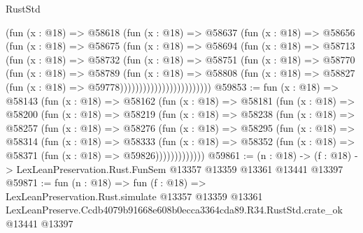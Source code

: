 \begin{lexlean}{RustStd}
\begin{coremodule}
                          (fun (x : @18) =>
                          @58618
                            (fun (x : @18) =>
                            @58637
                              (fun (x : @18) =>
                              @58656
                                (fun (x : @18) =>
                                @58675
                                  (fun (x : @18) =>
                                  @58694
                                    (fun (x : @18) =>
                                    @58713
                                      (fun (x : @18) =>
                                      @58732
                                        (fun (x : @18) =>
                                        @58751
                                          (fun (x : @18) =>
                                          @58770
                                            (fun (x : @18) =>
                                            @58789
                                              (fun (x : @18) =>
                                              @58808
                                                (fun (x : @18) =>
                                                @58827
                                                  (fun (x : @18) => @59778))))))))))))))))))))))))
@59853 := fun (x : @18) =>
  @58143
    (fun (x : @18) =>
    @58162
      (fun (x : @18) =>
      @58181
        (fun (x : @18) =>
        @58200
          (fun (x : @18) =>
          @58219
            (fun (x : @18) =>
            @58238
              (fun (x : @18) =>
              @58257
                (fun (x : @18) =>
                @58276
                  (fun (x : @18) =>
                  @58295
                    (fun (x : @18) =>
                    @58314
                      (fun (x : @18) =>
                      @58333
                        (fun (x : @18) =>
                        @58352 (fun (x : @18) => @58371 (fun (x : @18) => @59826)))))))))))))
@59861 := (n : @18) ->
  (f : @18) -> LexLeanPreservation.Rust.FunSem @13357 @13359 @13361 @13441 @13397
@59871 := fun (n : @18) =>
  fun (f : @18) =>
  LexLeanPreservation.Rust.simulate
    @13357
    @13359
    @13361
    LexLeanPreserve.Ccdb4079b91668e608b0ecca3364cda89.R34.RustStd.crate_ok
    @13441
    @13397
\end{coremodule}
\end{lexlean}
